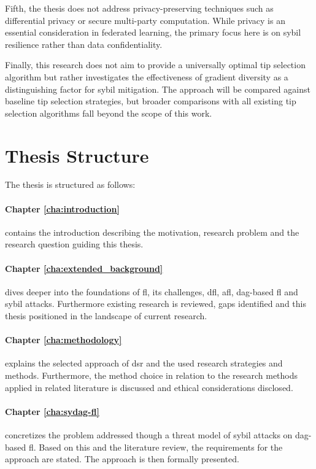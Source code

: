 Fifth, the thesis does not address privacy-preserving techniques such as differential privacy or secure multi-party computation. While privacy is an essential consideration in federated learning, the primary focus here is on sybil resilience rather than data confidentiality. 

Finally, this research does not aim to provide a universally optimal tip selection algorithm but rather investigates the effectiveness of gradient diversity as a distinguishing factor for sybil mitigation. The approach will be compared against baseline tip selection strategies, but broader comparisons with all existing tip selection algorithms fall beyond the scope of this work.

\pagebreak
\section{Thesis Structure}
The thesis is structured as follows:

\paragraph{Chapter \ref{cha:introduction}} contains the introduction describing the motivation, research problem and the research question guiding this thesis. 

\paragraph{Chapter \ref{cha:extended_background}} dives deeper into the foundations of \ac{fl}, its challenges, \ac{dfl}, \ac{afl}, \ac{dag}-based \ac{fl} and sybil attacks. Furthermore existing research is reviewed, gaps identified and this thesis positioned in the landscape of current research. 

\paragraph{Chapter \ref{cha:methodology}} explains the selected approach of \ac{dsr} and the used research strategies and methods. Furthermore, the method choice in relation to the research methods applied in related literature is discussed and ethical considerations disclosed. 

\paragraph{Chapter \ref{cha:sydag-fl}} concretizes the problem addressed though a threat model of sybil attacks on \ac{dag}-based \ac{fl}. Based on this and the literature review, the requirements for the approach are stated. The approach is then formally presented.

